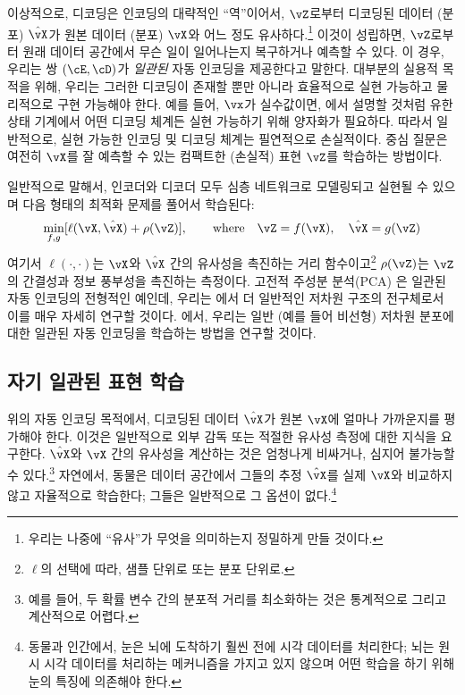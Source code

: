 \documentclass[../../book-main_ko.tex]{subfiles}
\begin{document}
이상적으로, 디코딩은 인코딩의 대략적인 ``역''이어서, \(\vZ\)로부터 디코딩된 데이터 (분포) \(\hat{\vX}\)가 원본 데이터 (분포) \(\vX\)와 어느 정도 유사하다.\footnote{우리는 나중에 ``유사''가 무엇을 의미하는지 정밀하게 만들 것이다.} 이것이 성립하면, \(\vZ\)로부터 원래 데이터 공간에서 무슨 일이 일어나는지 복구하거나 예측할 수 있다. 이 경우, 우리는 쌍 \((\cE, \cD)\)가 \textit{일관된} 자동 인코딩을 제공한다고 말한다. 대부분의 실용적 목적을 위해, 우리는 그러한 디코딩이 존재할 뿐만 아니라 효율적으로 실현 가능하고 물리적으로 구현 가능해야 한다. 예를 들어, \(\vx\)가 실수값이면, 에서 설명할 것처럼 유한 상태 기계에서 어떤 디코딩 체계든 실현 가능하기 위해 양자화가 필요하다. 따라서 일반적으로, 실현 가능한 인코딩 및 디코딩 체계는 필연적으로 손실적이다. 중심 질문은 여전히 \(\vX\)를 잘 예측할 수 있는 컴팩트한 (손실적) 표현 \(\vZ\)를 학습하는 방법이다.

일반적으로 말해서, 인코더와 디코더 모두 심층 네트워크로 모델링되고 실현될 수 있으며 다음 형태의 최적화 문제를 풀어서 학습된다:
\begin{equation}
   \min_{f, g} [\ell(\vX, \hat{\vX}) + \rho(\vZ)], \qquad \text{where} \quad \vZ = f(\vX), \quad \hat{\vX} = g(\vZ)
   \label{eqn:auto-encoding-objective}
\end{equation}
여기서 \(\ell(\cdot, \cdot)\)는 \(\vX\)와 \(\hat{\vX}\) 간의 유사성을 촉진하는 거리 함수이고\footnote{\(\ell\)의 선택에 따라, 샘플 단위로 또는 분포 단위로.} \(\rho(\vZ)\)는 \(\vZ\)의 간결성과 정보 풍부성을 촉진하는 측정이다. 고전적 주성분 분석(PCA) \cite{JolliffeI2002}은 일관된 자동 인코딩의 전형적인 예인데, 우리는 에서 더 일반적인 저차원 구조의 전구체로서 이를 매우 자세히 연구할 것이다. 에서, 우리는 일반 (예를 들어 비선형) 저차원 분포에 대한 일관된 자동 인코딩을 학습하는 방법을 연구할 것이다.


\subsection{자기 일관된 표현 학습}
위의 자동 인코딩 목적에서, 디코딩된 데이터 \(\hat{\vX}\)가 원본 \(\vX\)에 얼마나 가까운지를 평가해야 한다. 이것은 일반적으로 외부 감독 또는 적절한 유사성 측정에 대한 지식을 요구한다. \(\hat{\vX}\)와 \(\vX\) 간의 유사성을 계산하는 것은 엄청나게 비싸거나, 심지어 불가능할 수 있다.\footnote{예를 들어, 두 확률 변수 간의 분포적 거리를 최소화하는 것은 통계적으로 그리고 계산적으로 어렵다.} 자연에서, 동물은 데이터 공간에서 그들의 추정 \(\hat{\vX}\)를 실제 \(\vX\)와 비교하지 않고 자율적으로 학습한다; 그들은 일반적으로 그 옵션이 없다.\footnote{동물과 인간에서, 눈은 뇌에 도착하기 훨씬 전에 시각 데이터를 처리한다; 뇌는 원시 시각 데이터를 처리하는 메커니즘을 가지고 있지 않으며 어떤 학습을 하기 위해 눈의 특징에 의존해야 한다.}
\end{document}

